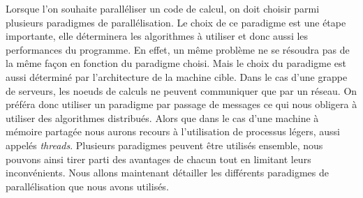 Lorsque l'on souhaite paralléliser un code de calcul, on doit choisir parmi plusieurs paradigmes de parallélisation.
%
Le choix de ce paradigme est une étape importante, elle déterminera les algorithmes à utiliser et donc aussi les performances du programme.
%
En effet, un même problème ne se résoudra pas de la même façon en fonction du paradigme choisi.
%
Mais le choix du paradigme est aussi déterminé par l'architecture de la machine cible.
%
Dans le cas d'une grappe de serveurs, les noeuds de calculs ne peuvent communiquer que par un réseau.
%
On préféra donc utiliser un paradigme par passage de messages ce qui nous obligera à utiliser des algorithmes distribués.
%
Alors que dans le cas d'une machine à mémoire partagée nous aurons recours à l'utilisation de processus légers, aussi appelés {\em threads}.
%
Plusieurs paradigmes peuvent être utilisés ensemble, nous pouvons ainsi tirer parti des avantages de chacun tout en limitant leurs inconvénients.
%
Nous allons maintenant détailler les différents paradigmes de parallélisation que nous avons utilisés.
